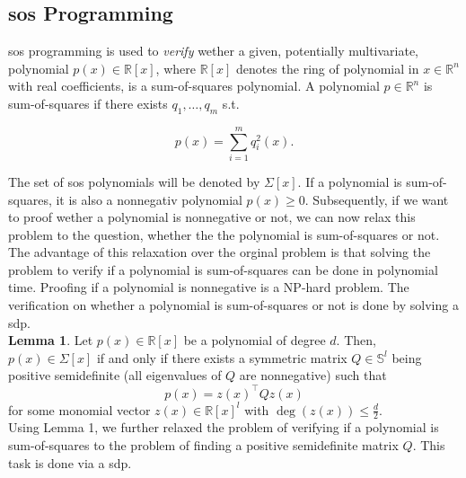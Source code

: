 \documentclass[10pt,a4paper,titlepage]{article}
\begin{document}
\subsection{\gls{sos} Programming \cite{cunis_loureiro2023}}
\gls{sos} programming is used to \textit{verify} wether a given, potentially multivariate, polynomial $p(x) \in \mathbb{R}[x]$, where $\mathbb{R}[x]$ denotes
the ring of polynomial in $x \in \mathbb{R}^n$ with real coefficients, is a sum-of-squares polynomial. A polynomial $p \in \mathbb{R}^n$ is sum-of-squares if
there exists $q_1, \dots, q_m$ s.t.

\begin{equation}
	p(x)=\sum_{i=1}^m q_i^2(x).
\end{equation}

The set of \gls{sos} polynomials will be denoted by $\Sigma[x]$. If a polynomial is sum-of-squares, it is also a nonnegativ polynomial $p(x) \geq 0$.
Subsequently, if we want to proof wether a polynomial is nonnegative or not, we can now relax this problem to the question, whether the the polynomial
is sum-of-squares or not. The advantage of this relaxation over the orginal problem is that solving the problem to verify if a polynomial is 
sum-of-squares can be done in polynomial time. Proofing if a polynomial is nonnegative is a NP-hard problem. The verification on whether a polynomial
is sum-of-squares or not is done by solving a \gls{sdp}.\\

\textbf{Lemma 1}. Let $p(x) \in \mathbb{R}[x]$ be a polynomial of degree $d$. Then, $p(x) \in \Sigma[x]$ if and only if there exists a symmetric
matrix $Q \in \mathbb{S}^l$ being positive semidefinite (all eigenvalues of $Q$ are nonnegative) such that
\begin{equation}
	p(x)=z(x)^{\top} Q z(x)
\end{equation}
for some monomial vector $z(x) \in \mathbb{R}[x]^l$ with $\operatorname{deg}(z(x)) \leq \frac{d}{2}$.\\

Using Lemma 1, we further relaxed the problem of verifying if a polynomial is sum-of-squares to the problem of finding a positive semidefinite matrix $Q$.
This task is done via a \gls{sdp}.
\end{document}
